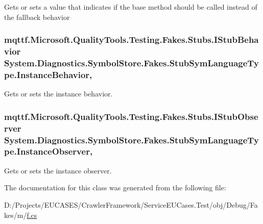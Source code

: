 Gets or sets a value that indicates if the base method should be called instead of the fallback behavior

\hypertarget{class_system_1_1_diagnostics_1_1_symbol_store_1_1_fakes_1_1_stub_sym_language_type_aea6194121eb263289f4404dd90c37c9b}{
\subsubsection[{Instance\-Behavior}]{\setlength{\rightskip}{0pt plus 5cm}mqttf.\-Microsoft.\-Quality\-Tools.\-Testing.\-Fakes.\-Stubs.\-I\-Stub\-Behavior System.\-Diagnostics.\-Symbol\-Store.\-Fakes.\-Stub\-Sym\-Language\-Type.\-Instance\-Behavior\hspace{0.3cm}{\ttfamily [get]}, {\ttfamily [set]}}}\label{class_system_1_1_diagnostics_1_1_symbol_store_1_1_fakes_1_1_stub_sym_language_type_aea6194121eb263289f4404dd90c37c9b}


Gets or sets the instance behavior.

\hypertarget{class_system_1_1_diagnostics_1_1_symbol_store_1_1_fakes_1_1_stub_sym_language_type_a9e9bf8171379903d368a338352103e0b}{
\subsubsection[{Instance\-Observer}]{\setlength{\rightskip}{0pt plus 5cm}mqttf.\-Microsoft.\-Quality\-Tools.\-Testing.\-Fakes.\-Stubs.\-I\-Stub\-Observer System.\-Diagnostics.\-Symbol\-Store.\-Fakes.\-Stub\-Sym\-Language\-Type.\-Instance\-Observer\hspace{0.3cm}{\ttfamily [get]}, {\ttfamily [set]}}}\label{class_system_1_1_diagnostics_1_1_symbol_store_1_1_fakes_1_1_stub_sym_language_type_a9e9bf8171379903d368a338352103e0b}


Gets or sets the instance observer.



The documentation for this class was generated from the following file\-:\begin{DoxyCompactItemize}
\item 
D\-:/\-Projects/\-E\-U\-C\-A\-S\-E\-S/\-Crawler\-Framework/\-Service\-E\-U\-Cases.\-Test/obj/\-Debug/\-Fakes/m/\hyperlink{m_2f_8cs}{f.\-cs}\end{DoxyCompactItemize}
